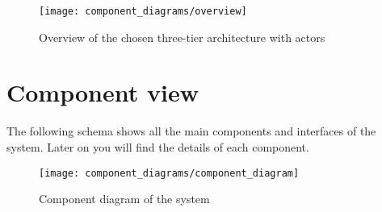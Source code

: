 \begin{figure}[h]
\texttt{[image: component\_diagrams/overview]}
\caption{Overview of the chosen three-tier architecture with actors}
\end{figure}

\clearpage

\section{Component view}
The following schema shows all the main components and interfaces of the system. Later on you will find the details of each component.


\begin{figure}[h]
\centering
\texttt{[image: component\_diagrams/component\_diagram]}
\caption{Component diagram of the system}
\end{figure}

\clearpage
\newpage

